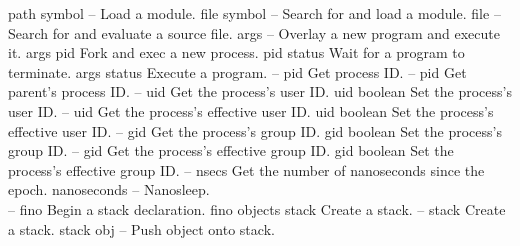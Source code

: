 \begin{longtable}{}
	{path symbol}
	{{\bf {}}}
	{--}
	{Load a module.}
\hline
\optableent
	{file symbol}
	{{\bf {}}}
	{--}
	{Search for and load a module.}
\hline
\optableent
	{file}
	{{\bf {}}}
	{--}
	{Search for and evaluate a source file.}
\hline
\optableent
	{args}
	{{\bf {}}}
	{--}
	{Overlay a new program and execute it.}
\hline
\optableent
	{args}
	{{\bf {}}}
	{pid}
	{Fork and exec a new process.}
\hline
\optableent
	{pid}
	{{\bf {}}}
	{status}
	{Wait for a program to terminate.}
\hline
\optableent
	{args}
	{{\bf {}}}
	{status}
	{Execute a program.}
\hline
\optableent
	{--}
	{{\bf {}}}
	{pid}
	{Get process ID.}
\hline
\optableent
	{--}
	{{\bf {}}}
	{pid}
	{Get parent's process ID.}
\hline
\optableent
	{--}
	{{\bf {}}}
	{uid}
	{Get the process's user ID.}
\hline
\optableent
	{uid}
	{{\bf {}}}
	{boolean}
	{Set the process's user ID.}
\hline
\optableent
	{--}
	{{\bf {}}}
	{uid}
	{Get the process's effective user ID.}
\hline
\optableent
	{uid}
	{{\bf {}}}
	{boolean}
	{Set the process's effective user ID.}
\hline
\optableent
	{--}
	{{\bf {}}}
	{gid}
	{Get the process's group ID.}
\hline
\optableent
	{gid}
	{{\bf {}}}
	{boolean}
	{Set the process's group ID.}
\hline
\optableent
	{--}
	{{\bf {}}}
	{gid}
	{Get the process's effective group ID.}
\hline
\optableent
	{gid}
	{{\bf {}}}
	{boolean}
	{Set the process's effective group ID.}
\hline
\optableent
	{--}
	{{\bf {}}}
	{nsecs}
	{Get the number of nanoseconds since the epoch.}
\hline
\optableent
	{nanoseconds}
	{{\bf {}}}
	{--}
	{Nanosleep.}
\hline \hline
{} \\
\hline \hline
\optableent
	{--}
	{{\bf {}}}
	{fino}
	{Begin a stack declaration.}
\hline
\optableent
	{fino objects}
	{{\bf {}}}
	{stack}
	{Create a stack.}
\hline
\optableent
	{--}
	{{\bf {}}}
	{stack}
	{Create a stack.}
\hline
\optableent
	{stack obj}
	{{\bf {}}}
	{--}
	{Push object onto stack.}

\end{longtable}
